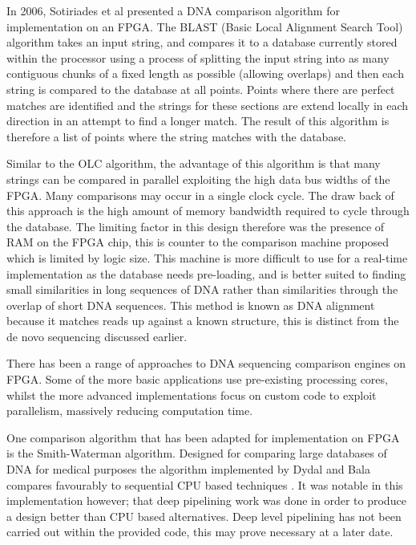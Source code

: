 In 2006, Sotiriades et al presented a DNA comparison algorithm for implementation on an FPGA\cite{sotiriades2006fpga}. The BLAST (Basic Local Alignment Search Tool) algorithm takes an input string, and compares it to a database currently stored within the processor using a process of splitting the input string into as many contiguous chunks of a fixed length as possible (allowing overlaps) and then each string is compared to the database at all points. Points where there are perfect matches are identified and the strings for these sections are extend locally in each direction in an attempt to find a longer match. The result of this algorithm is therefore a list of points where the string matches with the database.


Similar to the OLC algorithm, the advantage of this algorithm is that many strings can be compared in parallel exploiting the high data bus widths of the FPGA. Many comparisons may occur in a single clock cycle. The draw back of this approach is the high amount of memory bandwidth required to cycle through the database\cite{sotiriades2006fpga}. The limiting factor in this design therefore was the presence of RAM on the FPGA chip, this is counter to the comparison machine proposed which is limited by logic size.  This machine is more difficult to use for a real-time implementation as the database needs pre-loading, and is better suited to finding small similarities in long sequences of DNA rather than similarities through the overlap of short DNA sequences. This method is known as DNA alignment because it matches reads up against a known structure, this is distinct from the de novo sequencing discussed earlier. 


There has been a range of approaches to DNA sequencing comparison engines on FPGA. Some of the more basic applications use pre-existing processing cores, whilst the more advanced implementations focus on custom code to exploit parallelism, massively reducing computation time. 

One comparison algorithm that has been adapted for implementation on FPGA is the Smith-Waterman algorithm. Designed for comparing large databases of DNA for medical purposes the algorithm implemented by Dydal and Bala compares favourably to sequential CPU based techniques \cite{dydel2004large}. It was notable in this implementation however; that deep pipelining work was done in order to produce a design better than CPU based alternatives. Deep level pipelining has not been carried out within the provided code, this may prove necessary at a later date.


